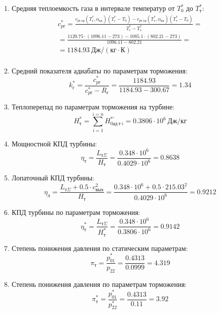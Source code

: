 \documentclass[a4paper,12pt]{article}
\begin{document}
\begin{enumerate}
        \item Средняя теплоемкость газа в интервале температур от $T_0^*$ до $T_т^*$:
        \begin{gather*}
            c_{pг}^* = \frac{
		         c_{pг\ ср} (T_г^*, \alpha_{вх}) (T_г^* - T_0) - c_{pг\ ср} (T_т^*, \alpha_{вх})(T_т^* - T_0)
		    }{
		        T_г^* - T_т^*} =\\
            =\frac{
                1120.75 \cdot
                (1096.11 - 273) -
		        1085.1 \cdot
                (802.21 - 273)
		    }{
		        1096.11 - 802.21} =\\
		     = 1184.93 \ Дж / (кг \cdot К)\\
        \end{gather*}

        \item Средний показателя адиабаты по параметрам торможения:
        \[
            k_г^* = \frac{ c_{pг}^* }{ c_{pг}^* - R_г } =
                \frac{
                    1184.93
                }{
                    1184.93 - 300.67
                }
            = 1.34
        \]

        \item Теплоперепад по параметрам торможения на турбине:
        \[
            H_т^* = \sum_{i=1}^{i=n}H_{0ад\ т\ i}^{*\prime} =
            0.3806 \cdot 10^6 \ Дж/кг
        \]

        \item Мощностной КПД турбины:
        \[
            \eta_т = \frac{ L_{т\Sigma} }{ H_т } =
                \frac{ 0.348 \cdot 10^6 }{ 0.4029 \cdot 10^6 } =
            0.8638
        \]

        \item Лопаточный КПД турбины:
        \[
            \eta_л = \frac{
                        L_{т\Sigma} + 0.5 \cdot c_{вых}^2
                    }{ H_т } =
            \frac{
                0.348 \cdot 10^6 + 0.5 \cdot 215.03 ^ 2
            }{ 0.4029 \cdot 10^6 } =
            0.9212
        \]

        \item КПД турбины по параметрам торможения:
        \[
            \eta_т^* = \frac{ L_{т\Sigma} }{ H_т^* } =
                \frac{ 0.348 \cdot 10^6 }{ 0.3806 \cdot 10^6 } =
            0.9142
        \]

        \item Степень понижения давления по статическим параметрам:
        \[
            \pi_{т} = \frac{p_{01}^*}{p_{2 2}} =
            \frac{0.4313}{0.0999} =
            4.319
        \]

        \item Степень понижения давления по параметрам торможения:
        \[
            \pi_{т}^* = \frac{p_{01}^*}{p_{2 2}^*} =
            \frac{0.4313}{0.11} =
            3.92
        \]

    \end{enumerate}
    
\end{document}
